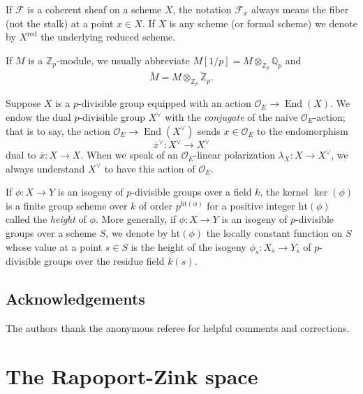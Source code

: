 \documentclass[11pt]{alggeom}
\newcommand{\red}{\mathrm{red}}
\newcommand{\Q}{\mathbb Q}
\newcommand{\Z}{\mathbb Z}
\newcommand{\co}{\mathcal O}
\DeclareMathOperator{\End}{End}
\begin{document}
If $\mathscr{F}$ is a coherent sheaf on a scheme $X$, the notation $\mathscr{F}_x$ always means the fiber (not the stalk) at a point $x\in X$.
If $X$ is any scheme (or formal scheme) we denote by $X^\red$ the underlying reduced scheme.




If $M$ is a $\Z_p$-module, we  usually abbreviate $M[1/p] = M\otimes_{\Z_p} \Q_p$ and 
\[
\breve{M}=M\otimes_{\Z_p}\breve{\Z}_p.
\]


 

Suppose $X$ is a $p$-divisible group equipped with an action $\co_E \to \End(X)$.
We  endow the dual $p$-divisible group $X^\vee$ with the \emph{conjugate} of the naive $\co_E$-action; that is to say, the action $\co_E \to \End(X^\vee)$ sends $x\in \co_E$ to the endomorphism 
\begin{equation}\label{conjugate convention}
\overline{x}^\vee : X^\vee \to X^\vee
\end{equation}
 dual to $\overline{x} : X \to X$.  When we speak of an $\co_E$-linear polarization  $\lambda_X : X \to X^\vee$, we always understand $X^\vee$ to have this action of $\co_E$.
 
 
If $\phi : X\to Y$ is an isogeny of $p$-divisible groups over a field $k$, the kernel $\ker(\phi)$ is a finite group scheme over $k$ of order $p^{\mathrm{ht}(\phi)}$ for a positive integer $\mathrm{ht}(\phi)$ called the \emph{height} of $\phi$.
More generally, if $\phi : X\to Y$ is an isogeny of $p$-divisible groups over a scheme $S$, we denote by $\mathrm{ht}(\phi)$ the locally constant function on $S$ whose value at a point $s\in S$ is the height of the isogeny $\phi_s:X_s \to Y_s$
of $p$-divisible groups over the residue field $k(s)$.
 
 
 
 \subsection{Acknowledgements}
 
 
 
 The authors thank the anonymous referee for helpful comments and corrections.
 
 

\section{The Rapoport-Zink space}
\label{s:partialRZ}
\end{document}
